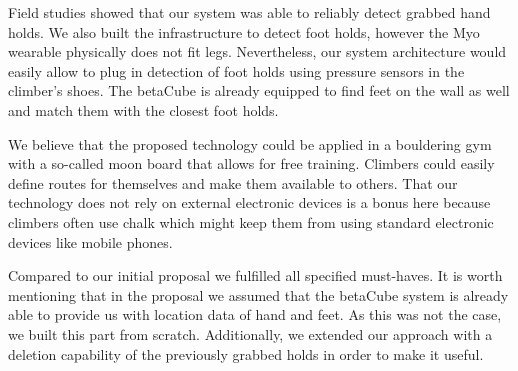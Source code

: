 Field studies showed that our system was able to reliably detect grabbed hand holds.
We also built the infrastructure to detect foot holds, however the Myo wearable physically does not fit legs.
Nevertheless, our system architecture would easily allow to plug in detection of foot holds using pressure sensors in the climber's shoes.
The betaCube is already equipped to find feet on the wall as well and match them with the closest foot holds.

We believe that the proposed technology could be applied in a bouldering gym with a so-called moon board that allows for free training.
Climbers could easily define routes for themselves and make them available to others.
That our technology does not rely on external electronic devices is a bonus here because climbers often use chalk which might keep them from using standard electronic devices like mobile phones.

Compared to our initial proposal we fulfilled all specified must-haves.
It is worth mentioning that in the proposal we assumed that the betaCube system is already able to provide us with location data of hand and feet.
As this was not the case, we built this part from scratch.
Additionally, we extended our approach with a deletion capability of the previously grabbed holds in order to make it useful.

